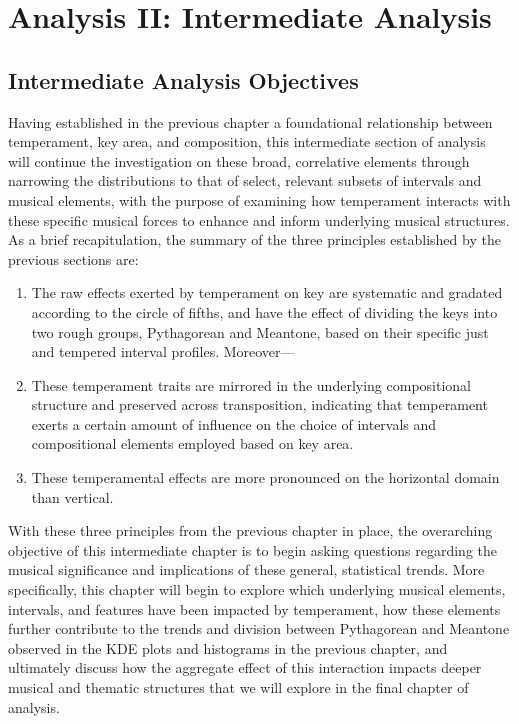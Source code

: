     
    
    
    

    \hypertarget{Analysis II: Intermediate Analysis}{\chapter{Analysis II: Intermediate Analysis}\label{Analysis II: Intermediate Analysis}}


    \section{Intermediate Analysis
Objectives}\label{intermediate-analysis-objectives}

    Having established in the previous chapter a foundational relationship
between temperament, key area, and composition, this intermediate
section of analysis will continue the investigation on these broad,
correlative elements through narrowing the distributions to that of
select, relevant subsets of intervals and musical elements, with the
purpose of examining how temperament interacts with these specific
musical forces to enhance and inform underlying musical structures. As a
brief recapitulation, the summary of the three principles established by
the previous sections are:

\begin{enumerate}
\def\labelenumi{\arabic{enumi}.}
\tightlist
\item
  The raw effects exerted by temperament on key are systematic and
  gradated according to the circle of fifths, and have the effect of
  dividing the keys into two rough groups, Pythagorean and Meantone,
  based on their specific just and tempered interval profiles.
  Moreover---
\item
  These temperament traits are mirrored in the underlying compositional
  structure and preserved across transposition, indicating that
  temperament exerts a certain amount of influence on the choice of
  intervals and compositional elements employed based on key area.
\item
  These temperamental effects are more pronounced on the horizontal
  domain than vertical.
\end{enumerate}

With these three principles from the previous chapter in place, the
overarching objective of this intermediate chapter is to begin asking
questions regarding the musical significance and implications of these
general, statistical trends. More specifically, this chapter will begin
to explore which underlying musical elements, intervals, and features
have been impacted by temperament, how these elements further contribute
to the trends and division between Pythagorean and Meantone observed in
the KDE plots and histograms in the previous chapter, and ultimately
discuss how the aggregate effect of this interaction impacts deeper
musical and thematic structures that we will explore in the final
chapter of analysis.


